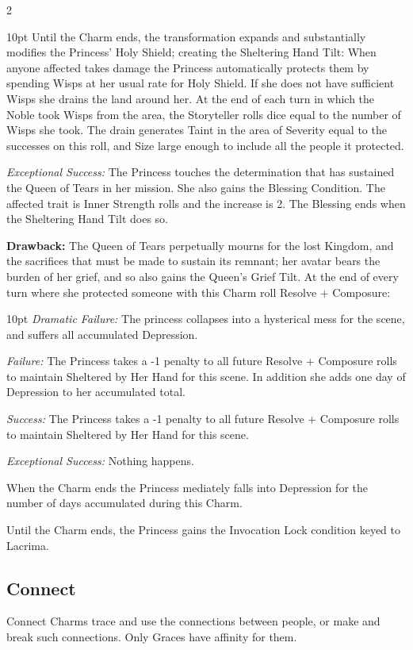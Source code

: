 \begin{multicols}{2}
\begin{myindentpar}{10pt}
    Until the Charm ends, the transformation expands and substantially modifies the Princess' Holy Shield; creating the Sheltering Hand Tilt: When anyone affected takes damage the Princess automatically protects them by spending Wisps at her usual rate for Holy Shield. If she does not have sufficient Wisps she drains the land around her. At the end of each turn in which the Noble took Wisps from the area, the Storyteller rolls dice equal to the number of Wisps she took. The drain generates Taint in the area of Severity equal to the successes on this roll, and Size large enough to include all the people it protected.
    

    \emph{Exceptional Success:} The Princess touches the determination that has sustained the Queen of Tears in her mission. She also gains the Blessing Condition. The affected trait is Inner Strength rolls and the increase is 2. The Blessing ends when the Sheltering Hand Tilt does so.\end{myindentpar}

\noindent \textbf{Drawback:} The Queen of Tears perpetually mourns for the lost Kingdom, and the sacrifices that must be made to sustain its remnant; her avatar bears the burden of her grief, and so also gains the Queen's Grief Tilt. At the end of every turn where she protected someone with this Charm roll Resolve + Composure: 

   \begin{myindentpar}{10pt}   \emph{Dramatic Failure:} The princess collapses into a hysterical mess for the scene, and suffers all accumulated Depression.
    
    \emph{Failure:} The Princess takes a -1 penalty to all future Resolve + Composure rolls to maintain Sheltered by Her Hand for this scene. In addition she adds one day of Depression to her accumulated total. 

    \emph{Success:} The Princess takes a -1 penalty to all future Resolve + Composure rolls to maintain Sheltered by Her Hand for this scene.

    \emph{Exceptional Success:} Nothing happens. \end{myindentpar}

When the Charm ends the Princess mediately falls into Depression for the number of days accumulated during this Charm. 
    
Until the Charm ends, the Princess gains the Invocation Lock condition keyed to Lacrima.

\subsection*{Connect}
\label{subsec:Connect}
Connect Charms trace and use the connections between people, or make and break such connections. Only Graces have affinity for them.


\end{multicols}
